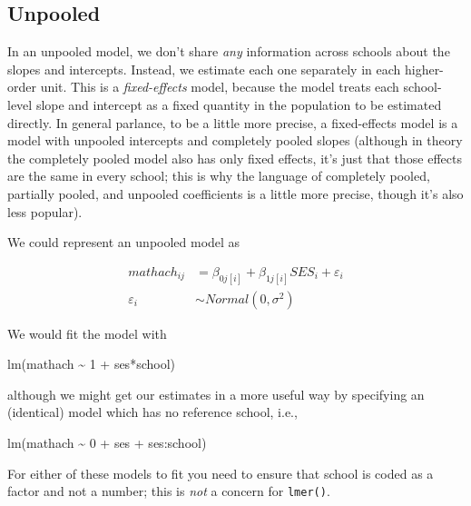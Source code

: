 \documentclass[
  letterpaper,
  DIV=11,
  numbers=noendperiod]{scrreprt}
\newenvironment{Shaded}{\begin{snugshade}}{\end{snugshade}}
\newcommand{\DecValTok}[1]{\textcolor[rgb]{0.25,0.63,0.44}{#1}}
\newcommand{\FunctionTok}[1]{\textcolor[rgb]{0.02,0.16,0.49}{#1}}
\newcommand{\NormalTok}[1]{\textcolor[rgb]{0.00,0.44,0.13}{#1}}
\newcommand{\SpecialCharTok}[1]{\textcolor[rgb]{0.25,0.44,0.63}{#1}}
\begin{document}
\hypertarget{unpooled}{%
\subsection{Unpooled}\label{unpooled}}

In an unpooled model, we don't share \emph{any} information across
schools about the slopes and intercepts. Instead, we estimate each one
separately in each higher-order unit. This is a \emph{fixed-effects}
model, because the model treats each school-level slope and intercept as
a fixed quantity in the population to be estimated directly. In general
parlance, to be a little more precise, a fixed-effects model is a model
with unpooled intercepts and completely pooled slopes (although in
theory the completely pooled model also has only fixed effects, it's
just that those effects are the same in every school; this is why the
language of completely pooled, partially pooled, and unpooled
coefficients is a little more precise, though it's also less popular).

We could represent an unpooled model as

\[\begin{aligned}
    mathach_{ij} &= \beta_{0j[i]} + \beta_{1j[i]}SES_i + \varepsilon_i \\
    \varepsilon_i &\sim Normal(0, \sigma^2)
\end{aligned}\]

We would fit the model with

\begin{Shaded}
\begin{Highlighting}[]
\FunctionTok{lm}\NormalTok{(mathach }\SpecialCharTok{\textasciitilde{}} \DecValTok{1} \SpecialCharTok{+}\NormalTok{ ses}\SpecialCharTok{*}\NormalTok{school)}
\end{Highlighting}
\end{Shaded}

although we might get our estimates in a more useful way by specifying
an (identical) model which has no reference school, i.e.,

\begin{Shaded}
\begin{Highlighting}[]
\FunctionTok{lm}\NormalTok{(mathach }\SpecialCharTok{\textasciitilde{}} \DecValTok{0} \SpecialCharTok{+}\NormalTok{ ses }\SpecialCharTok{+}\NormalTok{ ses}\SpecialCharTok{:}\NormalTok{school)}
\end{Highlighting}
\end{Shaded}

For either of these models to fit you need to ensure that school is
coded as a factor and not a number; this is \emph{not} a concern for
\texttt{lmer()}.
\end{document}
